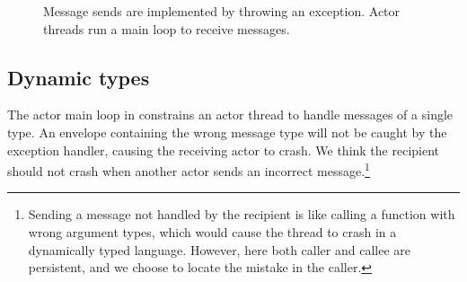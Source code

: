 \documentclass[sigplan,screen]{acmart}
\newcommand{\Conid}[1]{\mathit{#1}}
\newcommand{\Varid}[1]{\mathit{#1}}
\def\resethooks{%
  \global\let\SaveRestoreHook\empty
  \global\let\ColumnHook\empty}
\newcommand{\hsindent}[1]{\quad}%
\begin{document}
\begin{figure}
\resethooks
\caption{
    Message sends are implemented by throwing an exception.
    Actor threads run a main loop to receive messages.
}
\label{fig:static-impl}
\end{figure}




\subsection{Dynamic types}
\label{sec:dynamic-types}


The actor main loop in  constrains an actor
thread to handle messages of a single type.
%
An envelope containing the wrong message type will not be caught by the
exception handler, causing the receiving actor to crash.
%
We think the recipient should not crash when another actor sends an incorrect
message.\footnote{
    Sending a message not handled by the recipient is like calling a function
    with wrong argument types, which would cause the thread to crash in a
    dynamically typed language. However, here both caller and callee are
    persistent, and we choose to locate the mistake in the caller.
}
\end{document}
